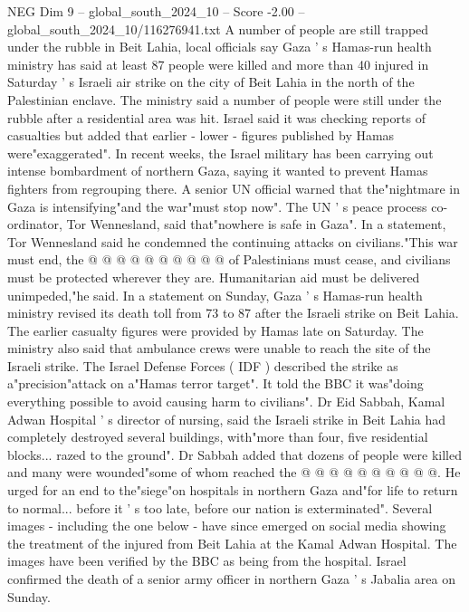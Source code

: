 \begin{textsample}{NEG Dim 9 – global\_south\_2024\_10 – Score -2.00 – global\_south\_2024\_10/116276941.txt}  \label{ex:f9_neg_374}
A number of people are still trapped under the rubble in Beit Lahia, local officials say Gaza ' s Hamas-run health ministry has said at least 87 people were killed and more than 40 injured in Saturday ' s Israeli air strike on the city of Beit Lahia in the north of the Palestinian enclave.
The ministry said a number of people were still under the rubble after a residential area was hit.
Israel said it was checking reports of casualties but added that earlier - lower - figures published by Hamas were"exaggerated".
In recent weeks, the Israel military has been carrying out intense bombardment of northern Gaza, saying it wanted to prevent Hamas fighters from regrouping there.
A senior UN official warned that the"nightmare in Gaza is intensifying"and the war"must stop now".
The UN ' s peace process co-ordinator, Tor Wennesland, said that"nowhere is safe in Gaza".
In a statement, Tor Wennesland said he condemned the continuing attacks on civilians."This war must end, the @ @ @ @ @ @ @ @ @ @ of Palestinians must cease, and civilians must be protected wherever they are.
Humanitarian aid must be delivered unimpeded,"he said.
In a statement on Sunday, Gaza ' s Hamas-run health ministry revised its death toll from 73 to 87 after the Israeli strike on Beit Lahia.
The earlier casualty figures were provided by Hamas late on Saturday.
The ministry also said that ambulance crews were unable to reach the site of the Israeli strike.
The Israel Defense Forces ( IDF ) described the strike as a"precision"attack on a"Hamas terror target".
It told the BBC it was"doing everything possible to avoid causing harm to civilians".
Dr Eid Sabbah, Kamal Adwan Hospital ' s director of nursing, said the Israeli strike in Beit Lahia had completely destroyed several buildings, with"more than four, five residential blocks... razed to the ground".
Dr Sabbah added that dozens of people were killed and many were wounded"some of whom reached the @ @ @ @ @ @ @ @ @ @.
He urged for an end to the"siege"on hospitals in northern Gaza and"for life to return to normal... before it ' s too late, before our nation is exterminated".
Several images - including the one below - have since emerged on social media showing the treatment of the injured from Beit Lahia at the Kamal Adwan Hospital.
The images have been verified by the BBC as being from the hospital.
Israel confirmed the death of a senior army officer in northern Gaza ' s Jabalia area on Sunday.

\end{textsample}
